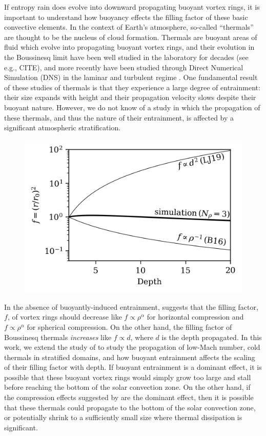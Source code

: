 \documentclass[twocolumn, amsmath, amsfonts, amssymb, trackchanges]{aastex62}
\begin{document}
If entropy rain does evolve into downward propagating buoyant vortex rings, it is
important to understand how buoyancy effects the filling factor of these basic
convective elements. In the context of Earth's atmosphere, so-called ``thermals''
are thought to be the nucleus of cloud formation. Thermals are buoyant areas
of fluid which evolve into propagating buoyant vortex rings, and their
evolution in the Boussinesq limit have been well studied in the laboratory
for decades (see e.g., CITE), and more recently have been studied through
Direct Numerical Simulation (DNS) in the laminar and turbulent regime
\citep{lecoanet&jeevanjee2018}. One fundamental result of these studies of
thermals is that they experience a large degree of entrainment: their size expands
with height and their propagation velocity slows despite their buoyant nature.
However, we do not know of a study in which the propagation of these thermals,
and thus the nature of their entrainment, is affected by a 
significant atmospheric stratification.

\begin{figure}[t!]
    \includegraphics[width=\columnwidth]{overview_fig.png}
    \caption{
    \label{fig:overview} }
\end{figure}


In the absence of buoyantly-induced entrainment, \citet{brandenburg2016}
suggests that the filling factor, $f$, of vortex rings should decrease like
$f \propto \rho^{\alpha}$ for horizontal compression and $f \propto \rho^{\alpha}$ for 
spherical compression. On the other hand, the filling factor of Boussinesq
thermals \emph{increases} like $f \propto d$, where $d$ is the depth propagated.
In this work, we extend the study of \citet{lecoanet&jeevanjee2018} to study
the propagation of low-Mach number, cold thermals in stratified domains, and how
buoyant entrainment affects the scaling of their filling factor with depth. If
buoyant entrainment is a dominant effect, it is possible that these buoyant vortex rings
would simply grow too large and stall before reaching the bottom of the solar convection zone.
On the other hand, if the compression effects suggested by \citet{brandenburg2016} are the
dominant effect, then it is possible that these thermals could propagate to the bottom of the solar
convection zone, or potentially shrink to a sufficiently small size where thermal dissipation is
significant.
\end{document}
